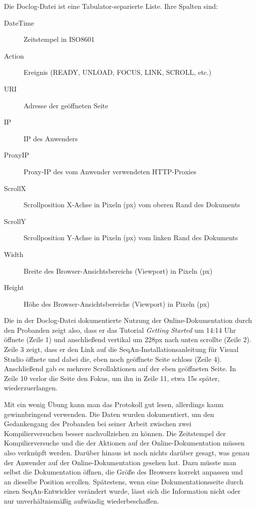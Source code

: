 Die Doclog-Datei ist eine Tabulator-separierte Liste. Ihre Spalten sind:

\begin{description}
	\item[DateTime] Zeitstempel in ISO8601
	\item[Action] Ereignis (READY, UNLOAD, FOCUS, LINK, SCROLL, etc.)
	\item[URI] Adresse der geöffneten Seite
	\item[IP] IP des Anwenders
	\item[ProxyIP] Proxy-IP des vom Anwender verwendeten HTTP-Proxies
	\item[ScrollX] Scrollposition X-Achse in Pixeln (px) vom oberen Rand des Dokuments
	\item[ScrollY] Scrollposition Y-Achse in Pixeln (px) vom linken Rand des Dokuments
	\item[Width] Breite des Browser-Ansichtsbereichs (Viewport) in Pixeln (px)
	\item[Height] Höhe des Browser-Ansichtsbereichs (Viewport) in Pixeln (px)
\end{description}

Die in der Doclog-Datei dokumentierte Nutzung der Online-Dokumentation durch den Probanden zeigt also, dass er das Tutorial \textit{Getting Started} um 14:14 Uhr öffnete (Zeile 1) und anschließend vertikal um 228px nach unten scrollte (Zeile 2). Zeile 3 zeigt, dass er den Link auf die SeqAn-Installationsanleitung für Visual Studio öffnete und dabei die, eben noch geöffnete Seite schloss (Zeile 4). Anschließend gab es mehrere Scrollaktionen auf der eben geöffneten Seite. In Zeile 10 verlor die Seite den Fokus, um ihn in Zeile 11, etwa 15s später, wiederzuerlangen.

Mit ein wenig Übung kann man das Protokoll gut lesen, allerdings kaum gewinnbringend verwenden. Die Daten wurden dokumentiert, um den Gedankengang des Probanden bei seiner Arbeit zwischen zwei Kompilierversuchen besser nachvollziehen zu können. Die Zeitstempel der Kompilierversuche und die der Aktionen auf der Online-Dokumentation müssen also verknüpft werden. Darüber hinaus ist noch nichts darüber gesagt, was genau der Anwender auf der Online-Dokumentation gesehen hat. Dazu müsste man selbst die Dokumentation öffnen, die Größe des Browsers korrekt anpassen und an dieselbe Position scrollen. Spätestens, wenn eine Dokumentationsseite durch einen SeqAn-Entwickler verändert wurde, lässt sich die Information nicht oder nur unverhältnismäßig aufwändig wiederbeschaffen.

